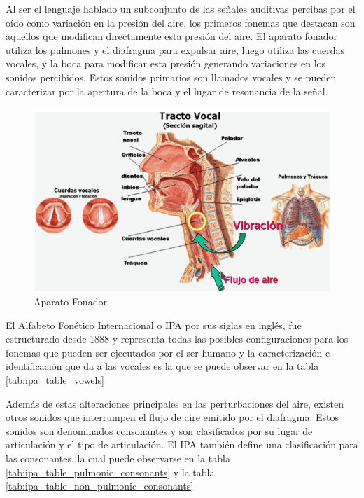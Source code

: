 \documentclass[a4paper,12pt,twoside]{report}
\begin{document}
Al ser el lenguaje hablado un subconjunto de las señales auditivas percibas por el oído como variación en la presión del aire, los primeros fonemas que destacan son aquellos que modifican directamente esta presión del aire. El aparato fonador utiliza los pulmones y el diafragma para expulsar aire, luego utiliza las cuerdas vocales, y la boca para modificar esta presión generando variaciones en los sonidos percibidos. Estos sonidos primarios son llamados vocales y se pueden caracterizar por la apertura de la boca y el lugar de resonancia de la señal.

\begin{figure}[H]
\caption{Aparato Fonador\cite{hableomsDeVoz}}
\label{img:aparato_fonador}
\includegraphics[width=\textwidth]{imagenes/03_02_aparato_fonador.png}
\end{figure}

El Alfabeto Fonético Internacional o IPA por sus siglas en inglés, fue estructurado desde 1888 y representa todas las posibles configuraciones para los fonemas que pueden ser ejecutados por el ser humano y la caracterización e identificación que da a las vocales es la que se puede observar en la tabla \ref{tab:ipa_table_vowels}




Además de estas alteraciones principales en las perturbaciones del aire, existen otros sonidos que interrumpen el flujo de aire emitido por el diafragma. Estos sonidos son denominados consonantes y son clasificados por su lugar de articulación y el tipo de articulación. El IPA también define una clasificación para las consonantes, la cual puede observarse en la tabla \ref{tab:ipa_table_pulmonic_consonants} y la tabla \ref{tab:ipa_table_non_pulmonic_consonants}
\end{document}
